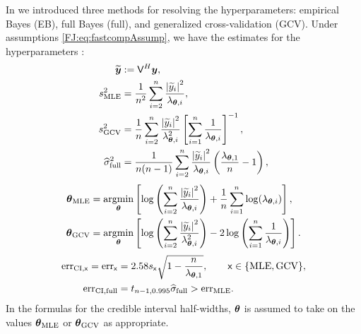 \documentclass[graybox,footinfo]{svmult}
\newcommand{\abs}[1]{\left\lvert #1 \right\rvert} %
\begin{document}
In \cite{RatHic19a} we introduced three methods for resolving the hyperparameters:  empirical Bayes (EB), full Bayes (full), and generalized cross-validation (GCV).  Under assumptions \eqref{FJ:eq:fastcompAssump}, we have the estimates for the hyperparameters \cite[Theorem 2]{RatHic19a}:
		\begin{align*}
		\nonumber 
		\widetilde{\bsy} &:= \mathsf{V}^H \bsy, \\
		\nonumber
		s^2_\textup{MLE} 
		& =
		\frac{1}{n^2} 
		\sum_{i=2}^n \frac{\abs{\widetilde{y}_i}^2}{\lambda_{\bstheta,i}},  \\
		\nonumber 
		s^2_{\textup{GCV}} & =  \frac 1{n} \sum_{i=2}^n \frac{\abs{\widetilde{y}_i}^2}{\lambda_{\bstheta,i}^2}  \left [ \sum_{i=1}^n \frac{1}{\lambda_{\bstheta,i}} \right]^{-1}, \\
		\nonumber
		\widehat{\sigma}^2_{\textup{full}} &= \frac{1}{n(n-1)} \sum_{i=2}^n \frac{\abs{\widetilde{y}_i}^2}{\lambda_{\bstheta,i}}  \left(\frac{\lambda_{\bstheta,1}}{n}  - 1  \right), 
		\end{align*}
	\begin{subequations}
		\label{FJ:eqn:fastTheta}
		\begin{align}
		\label{FJ:eqn:fastThetaMLE}
		\bstheta_\textup{MLE}
		&= 
		\argmin_{\bstheta}
		\left[
		\log\left(
		\sum_{i=2}^n \frac{\abs{\widetilde{y}_i}^2}{\lambda_{\bstheta,i}}
		\right) 
		+ \frac{1}{n}\sum_{i=1}^n \log(\lambda_{\bstheta,i})
		\right],\\
		\label{FJ:eqn:fastThetaGCV} 
		\bstheta_{\textup{GCV}} 
		&= \argmin_\bstheta \left[ \log \left ( \sum_{i=2}^n \frac{\abs{\widetilde{y}_i}^2}{\lambda_{\bstheta,i}^2} 
		\right)  
		-2\log\left( \sum_{i=1}^n \frac{1}{\lambda_{\bstheta,i}} \right)
		\right].
		\end{align}
	\end{subequations}
\begin{subequations}
	\label{FJ:errSimple}
	\begin{align}
		\label{FJ:eqn:err_MLEGCV}
		\textup{err}_{\textup{CI},\mathsf{x}} = \textup{err}_{\mathsf{x}} & = 2.58 s_{\mathsf{x}} \sqrt{1 - \frac{n}{\lambda_{\bstheta,1}} }, \qquad \mathsf{x} \in \{\textup{MLE}, \textup{GCV}\},  \\ 
		\textup{err}_{\textup{CI},\textup{full}} 
		& = t_{n-1,0.995} \widehat{\sigma}_{\textup{full}} > \textup{err}_\textup{MLE}. \label{FJ:eq:errFull}
	\end{align}
\end{subequations}
In the formulas for the credible interval half-widths, ${\boldsymbol{\theta}}$ is assumed to take on the values ${\boldsymbol{\theta}}_{\textup{MLE}}$ or ${\boldsymbol{\theta}}_{\textup{GCV}}$ as appropriate.
\end{document}
